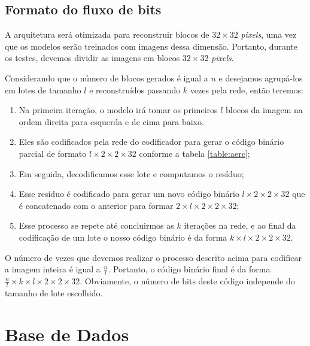 


\subsection{Formato do fluxo de bits}

A arquitetura será otimizada para reconstruir blocos de $32 \times 32$ \textit{pixels}, uma vez que os modelos serão treinados com imagens dessa dimensão. Portanto, durante os testes, devemos dividir as imagens em blocos $32 \times 32$ \textit{pixels}. 

Considerando que o número de blocos gerados é igual a $n$ e desejamos agrupá-los em lotes de tamanho $l$ e reconstruídos passando $k$ vezes pela rede, então teremos:
\begin{enumerate}
	\item Na primeira iteração, o modelo irá tomar os primeiros $l$ blocos da imagem na ordem direita para esquerda e de cima para baixo. 	\item Eles são codificados pela rede do codificador para gerar o código binário parcial de formato $l \times 2 \times 2 \times 32$ conforme a tabela \ref{table:aerc};
	\item Em seguida, decodificamos esse lote e computamos o resíduo;
	\item  Esse resíduo é codificado para gerar um novo código binário $l \times 2 \times 2 \times 32$ que é concatenado com o anterior para formar $2 \times l \times 2 \times 2 \times 32$;
	\item Esse processo se repete até concluirmos as $k$ iterações na rede, e ao final da codificação de um lote o nosso código binário é da forma $k \times l \times 2 \times 2 \times 32$. 
\end{enumerate}

O número de vezes que devemos realizar o processo descrito acima para codificar a imagem inteira é igual a $\frac{n}{l}$. Portanto, o código binário final é da forma $\frac{n}{l} \times k \times l \times 2 \times 2 \times 32$. Obviamente, o número de bits deste código independe do tamanho de lote escolhido. 


\section {Base de Dados}

